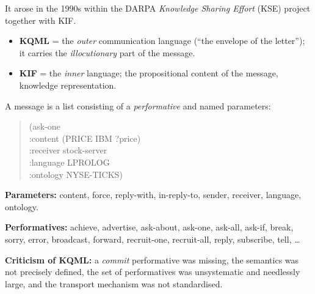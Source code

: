 \documentclass[11pt,a4paper]{article}
\theoremstyle{definition}
\providecommand{\uv}[1]{``#1''}
\begin{document}
\begin{defbox}
It arose in the 1990s within the DARPA \emph{Knowledge Sharing Effort} (KSE) project together with KIF.
\begin{itemize}
\item \textbf{KQML} = the \emph{outer} communication language (\uv{the envelope of the letter}); it
  carries the \emph{illocutionary} part of the message.
\item \textbf{KIF} = the \emph{inner} language; the propositional content of the message, knowledge
  representation.
\end{itemize}
A message is a list consisting of a \emph{performative} and named parameters:
\begin{quote}\small\ttfamily
(ask-one\\
\hspace*{1em}:content (PRICE IBM ?price)\\
\hspace*{1em}:receiver stock-server\\
\hspace*{1em}:language LPROLOG\\
\hspace*{1em}:ontology NYSE-TICKS)
\end{quote}
\textbf{Parameters:} content, force, reply-with, in-reply-to, sender, receiver, language, ontology.

\textbf{Performatives:} achieve, advertise, ask-about, ask-one, ask-all, ask-if,
break, sorry, error, broadcast, forward, recruit-one, recruit-all, reply, subscribe, tell, \dots
\end{defbox}

\textbf{Criticism of KQML:} a \emph{commit} performative was missing, the semantics was not precisely
defined, the set of performatives was unsystematic and needlessly large, and the transport mechanism
was not standardised.
\end{document}
